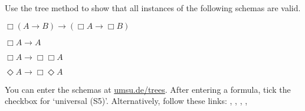 \begin{exercise}
  Use the tree method to show that all instances of the following schemas are valid.
   \begin{exlist}
   \item[\pr{K}] $\Box (A \to B) \to (\Box A \to \Box B)$
   \item[\pr{T}] $\Box A \to A$
   \item[\pr{4}] $\Box A \to \Box \Box A$
   \item[\pr{5}] $\Diamond A \to \Box \Diamond A$
   \end{exlist}
\end{exercise}
\begin{solution}
  You can enter the schemas at
  \href{https://www.umsu.de/trees/}{umsu.de/trees}.
  After entering a formula, tick the checkbox for `universal (S5)'.
  Alternatively, follow these links:
  \href{https://www.umsu.de/trees/#~8(A~5B)~5(~8A~5~8B)||universality}{}, \href{https://www.umsu.de/trees/#~8A~5A||universality}{},
  \href{https://www.umsu.de/trees/#~8A~5~8~8A||universality}{},
  \href{https://www.umsu.de/trees/#~9A~5~8~9A||universality}{},
\end{solution}


